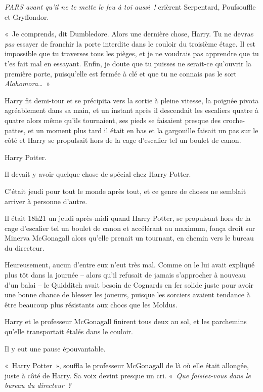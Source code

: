 \emph{PARS avant qu'il ne te mette le feu à toi aussi~!} crièrent Serpentard, Poufsouffle et Gryffondor.

«~Je comprends, dit Dumbledore.
Alors une dernière chose, Harry.
Tu ne devras \emph{pas} essayer de franchir la porte interdite dans le couloir du troisième étage.
Il est impossible que tu traverses tous les pièges, et je ne voudrais pas apprendre que tu t'es fait mal en essayant.
Enfin, je doute que tu puisses ne serait-ce qu'ouvrir la première porte, puisqu'elle est fermée à clé et que tu ne connais pas le sort \emph{Alohomora}…~»

Harry fit demi-tour et se précipita vers la sortie à pleine vitesse, la poignée pivota agréablement dans sa main, et un instant après il descendait les escaliers quatre à quatre alors même qu'ils tournaient, ses pieds se faisaient presque des croche-pattes, et un moment plus tard il était en bas et la gargouille faisait un pas sur le côté et Harry se propulsait hors de la cage d'escalier tel un boulet de canon.

\later

Harry Potter.

Il devait y avoir quelque chose de spécial chez Harry Potter.

C'était jeudi pour tout le monde après tout, et ce genre de choses ne semblait arriver à personne d'autre.

Il était 18h21 un jeudi après-midi quand Harry Potter, se propulsant hors de la cage d'escalier tel un boulet de canon et accélérant au maximum, fonça droit sur Minerva McGonagall alors qu'elle prenait un tournant, en chemin vers le bureau du directeur.

Heureusement, aucun d'entre eux n'eut très mal.
Comme on le lui avait expliqué plus tôt dans la journée -- alors qu'il refusait de jamais s'approcher à nouveau d'un balai -- le Quidditch avait besoin de Cognards en fer solide juste pour avoir une bonne chance de blesser les joueurs, puisque les sorciers avaient tendance à être beaucoup plus résistants aux chocs que les Moldus.

Harry et le professeur McGonagall finirent tous deux au sol, et les parchemins qu'elle transportait étalés dans le couloir.

Il y eut une pause épouvantable.

«~Harry Potter~», souffla le professeur McGonagall de là où elle était allongée, juste à côté de Harry.
Sa voix devint presque un cri.
«~\emph{Que faisiez-vous dans le bureau du directeur~?}

